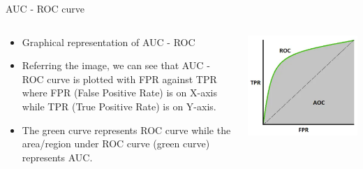 \documentclass[11pt]{beamer}
\begin{document}
\begin{frame}{AUC - ROC curve}
\begin{columns}[T] %
\begin{column}{.48\textwidth}
        \begin{itemize}
		\item Graphical representation of AUC - ROC
		\item Referring the image, we can see that AUC - ROC curve is plotted with FPR against TPR where FPR (False Positive Rate) is on X-axis while TPR (True Positive Rate) is on Y-axis. 
		\item The green curve represents ROC curve while the area/region under ROC curve (green curve) represents AUC.
        \end{itemize}
\end{column}%
\hfill%
\begin{column}{.48\textwidth}
        \includegraphics[width=\linewidth]{../05-pictures/lesson-4-1_pic_1.png}
\end{column}%
\end{columns}
\end{frame}
\end{document}
